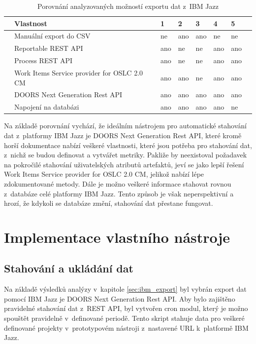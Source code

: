 \documentclass[czech,master]{diploma}
\begin{document}
\begin{table}[htp]
\centering
\begin{tabular}{@{}llllllll@{}}
\toprule
 & \textbf{Vlastnost}                          & \textbf{1} & \textbf{2} & \textbf{3} & \textbf{4} & \textbf{5} &  \\ \midrule
 & Manuální export do CSV                      & ne         & ano        & ano        & ne         & ne         &  \\
 & Reportable REST API                         & ano        & ne         & ne         & ano        & ano        &  \\
 & Process REST API                            & ano        & ne         & ne         & ano        & ano        &  \\
 & Work Items Service provider for OSLC 2.0 CM & ano        & ano        & ne         & ano        & ano        &  \\
 & DOORS Next Generation Rest API              & ano        & ano        & ano        & ano        & ano        &  \\
 & Napojení na databázi                        & ano        & ano        & ano        & ano        & ne         &  \\ \bottomrule
\end{tabular}
\caption{Porovnání analyzovaných možností exportu dat z~IBM Jazz}
\label{tab:ibm_jazz_export}
\end{table}

Na základě porovnání vychází, že ideálním nástrojem pro automatické stahování dat z~platformy IBM Jazz je  DOORS Next Generation Rest API, které kromě horší dokumentace nabízí veškeré vlastnosti, které jsou potřeba pro stahování dat, z~nichž se budou definovat a vytvářet metriky. Pakliže by neexistoval požadavek na pokročilé stahování uživatelských atributů artefaktů, jeví se jako lepší řešení Work Items Service provider for OSLC 2.0 CM, jelikož nabízí lépe zdokumentované metody. Dále je možno veškeré informace stahovat rovnou z~databáze celé platformy IBM Jazz. Tento způsob je však neperspektivní a hrozí, že kdykoli se databáze změní, stahování dat přestane fungovat.

\chapter{Implementace vlastního nástroje}
\section{Stahování a ukládání dat}
Na základě výsledků analýzy v~kapitole \ref{sec:ibm_export} byl vybrán export dat pomocí IBM Jazz je  DOORS Next Generation Rest API. Aby bylo zajištěno pravidelné stahování dat z~REST API, byl vytvořen cron modul, který je možno spouštět pravidelně v~definované periodě. Tento skript stahuje data pro veškeré definované projekty v~prototypovém nástroji z~nastavené URL k~platformě IBM Jazz.
\end{document}
